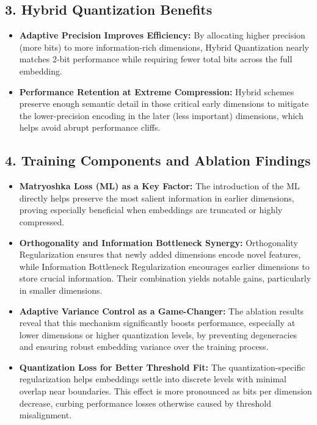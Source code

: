 \documentclass{article}
\begin{document}
\subsection*{3. Hybrid Quantization Benefits}
\begin{itemize}
    \item \textbf{Adaptive Precision Improves Efficiency:} By allocating higher precision (more bits) to more information-rich dimensions, Hybrid Quantization nearly matches 2-bit performance while requiring fewer total bits across the full embedding.
    \item \textbf{Performance Retention at Extreme Compression:} Hybrid schemes preserve enough semantic detail in those critical early dimensions to mitigate the lower-precision encoding in the later (less important) dimensions, which helps avoid abrupt performance cliffs.
\end{itemize}

\subsection*{4. Training Components and Ablation Findings}
\begin{itemize}
    \item \textbf{Matryoshka Loss (ML) as a Key Factor:} The introduction of the ML directly helps preserve the most salient information in earlier dimensions, proving especially beneficial when embeddings are truncated or highly compressed.
    \item \textbf{Orthogonality and Information Bottleneck Synergy:} Orthogonality Regularization ensures that newly added dimensions encode novel features, while Information Bottleneck Regularization encourages earlier dimensions to store crucial information. Their combination yields notable gains, particularly in smaller dimensions.
    \item \textbf{Adaptive Variance Control as a Game-Changer:} The ablation results reveal that this mechanism significantly boosts performance, especially at lower dimensions or higher quantization levels, by preventing degeneracies and ensuring robust embedding variance over the training process.
    \item \textbf{Quantization Loss for Better Threshold Fit:} The quantization-specific regularization helps embeddings settle into discrete levels with minimal overlap near boundaries. This effect is more pronounced as bits per dimension decrease, curbing performance losses otherwise caused by threshold misalignment.
\end{itemize}
\end{document}
